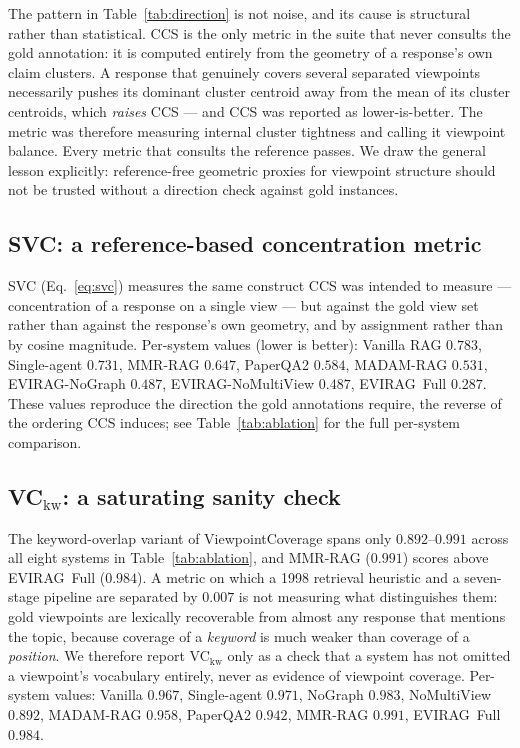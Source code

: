 \documentclass[11pt]{article}
\newcommand{\system}{\textsc{EVIRAG}\xspace}
\begin{document}
The pattern in Table~\ref{tab:direction} is not noise, and its cause is
structural rather than statistical.  CCS is the only metric in the suite that
never consults the gold annotation: it is computed entirely from the geometry
of a response's own claim clusters.  A response that genuinely covers several
separated viewpoints necessarily pushes its dominant cluster centroid away from
the mean of its cluster centroids, which \emph{raises} CCS --- and CCS was
reported as lower-is-better.  The metric was therefore measuring internal
cluster tightness and calling it viewpoint balance.  Every metric that consults
the reference passes.  We draw the general lesson explicitly: reference-free
geometric proxies for viewpoint structure should not be trusted without a
direction check against gold instances.

\subsection{SVC: a reference-based concentration metric}

SVC (Eq.~\ref{eq:svc}) measures the same construct CCS was intended to
measure --- concentration of a response on a single view --- but against the
gold view set rather than against the response's own geometry, and by
assignment rather than by cosine magnitude.  Per-system values (lower is
better): Vanilla RAG $0.783$, Single-agent $0.731$, MMR-RAG $0.647$,
PaperQA2 $0.584$, MADAM-RAG $0.531$, \system-NoGraph $0.487$,
\system-NoMultiView $0.487$, \system\ Full $\mathbf{0.287}$.  These values
reproduce the direction the gold annotations require, the reverse of the
ordering CCS induces; see Table~\ref{tab:ablation} for the full
per-system comparison.

\subsection{VC\texorpdfstring{$_\text{kw}$}{kw}: a saturating sanity check}

The keyword-overlap variant of ViewpointCoverage spans only $0.892$--$0.991$
across all eight systems in Table~\ref{tab:ablation}, and MMR-RAG ($0.991$)
scores above \system\ Full ($0.984$).  A metric on which a 1998 retrieval
heuristic and a seven-stage pipeline are separated by $0.007$ is not measuring
what distinguishes them: gold viewpoints are lexically recoverable from almost
any response that mentions the topic, because coverage of a \emph{keyword} is
much weaker than coverage of a \emph{position}.  We therefore report
VC$_\text{kw}$ only as a check that a system has not omitted a viewpoint's
vocabulary entirely, never as evidence of viewpoint coverage.  Per-system
values: Vanilla $0.967$, Single-agent
$0.971$, NoGraph $0.983$, NoMultiView $0.892$, MADAM-RAG $0.958$, PaperQA2
$0.942$, MMR-RAG $0.991$, \system\ Full $0.984$.
\end{document}
